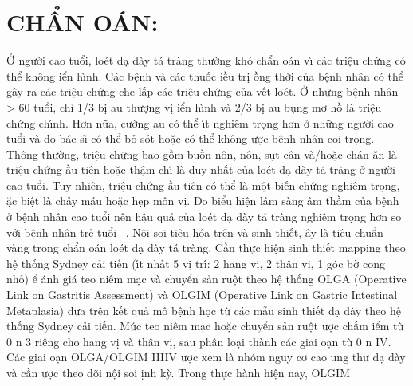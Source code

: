 \documentclass[9pt,twocolumn]{article}
\begin{document}
\section*
  {\textbf{CHẨN \text{\DJ}O\'{A}N:}}
Ở người cao tuổi, lo{\'e}t d{\d{a}} d\`{a}y t\'{a} tr\`{a}ng thường kh{\'{o}} chẩn \text{\dj}o\'{a}n v\`{\i} c\'{a}c tri{\^{\d{e}}}u chứng c{\'{o}} thể kh{\^o}ng \text{\dj}iển h\`{\i}nh. C\'{a}c b{\^{\d{e}}}nh v\`{a} c\'{a}c thuốc \text{\dj}iều tr\d{i} \text{\dj}ồng thời của b{\^{\d{e}}}nh nh\^{a}n c{\'{o}} thể g\^{a}y ra c\'{a}c tri{\^{\d{e}}}u chứng che lấp c\'{a}c tri{\^{\d{e}}}u chứng của v{{\'{\^{e}}}}t lo{\'e}t. Ở những b{\^{\d{e}}}nh nh\^{a}n {\textgreater} 60 tuổi, chỉ 1/3 b\d{i} \text{\dj}au thượng v\d{i} \text{\dj}iển h\`{\i}nh v\`{a} 2/3 b\d{i} \text{\dj}au b\d{u}ng mơ hồ l\`{a} tri{\^{\d{e}}}u chứng ch\'{\i}nh. Hơn nữa, cường  \text{\dj}au c{\'{o}} thể \'{\i}t nghi{\^{e}}m tr\d{o}ng hơn ở những người cao tuổi v\`{a} do  b\'{a}c s{\~{\i}} c{\'{o}} thể bỏ s{\'{o}}t hoặc c{\'{o}} thể kh{\^o}ng \text{\dj}ược b{\^{\d{e}}}nh nh\^{a}n coi tr\d{o}ng. Th{\^o}ng thường, tri{\^{\d{e}}}u chứng bao gồm buồn n{\^o}n, n{\^o}n, s\d{u}t c\^{a}n v\`{a}/hoặc ch\'{a}n {\u{a}}n l\`{a} tri{\^{\d{e}}}u chứng \text{\dj}ầu ti{\^{e}}n hoặc th{\^{\d{a}}}m ch\'{\i} l\`{a} duy nhất của lo{\'e}t d{\d{a}} d\`{a}y t\'{a} tr\`{a}ng ở người cao tuổi. Tuy nhi{\^{e}}n, tri{\^{\d{e}}}u chứng \text{\dj}ầu ti{\^{e}}n c{\'{o}} thể l\`{a} m{\^{\d{o}}}t bi{{\'{\^{e}}}}n chứng nghi{\^{e}}m tr\d{o}ng, \text{\dj}ặc bi{\^{\d{e}}}t l\`{a} chảy m\'{a}u hoặc h\d{e}p m{\^o}n v\d{i}. Do biểu hi{\^{\d{e}}}n l\^{a}m s\`{a}ng \^{a}m thầm của b{\^{\d{e}}}nh ở b{\^{\d{e}}}nh nh\^{a}n cao tuổi n{\^{e}}n h{\^{\d{a}}}u quả của lo{\'e}t d{\d{a}} d\`{a}y t\'{a} tr\`{a}ng nghi{\^{e}}m tr\d{o}ng hơn so với b{\^{\d{e}}}nh nh\^{a}n trẻ tuổi\unskip~\cite{2901310:34531806} . N{\^{\d{o}}}i soi ti{\^{e}}u h{\'{o}}a tr{\^{e}}n v\`{a} sinh thi{{\'{\^{e}}}}t, \text{\dj}\^{a}y l\`{a} ti{\^{e}}u chuẩn v\`{a}ng trong chẩn \text{\dj}o\'{a}n lo{\'e}t d{\d{a}} d\`{a}y t\'{a} tr\`{a}ng. Cần thực hi{\^{\d{e}}}n sinh thi{{\'{\^{e}}}}t mapping theo h{\^{\d{e}}} thống Sydney cải ti{{\'{\^{e}}}}n (\'{\i}t nhất 5 v\d{i} tr\'{\i}: 2 hang v\d{i}, 2 th\^{a}n v\d{i}, 1 g{\'{o}}c bờ cong nhỏ) \text{\dj}ể \text{\dj}\'{a}nh gi\'{a} teo ni{\^{e}}m m{\d{a}}c v\`{a} chuyển sản ru{\^{\d{o}}}t theo h{\^{\d{e}}} thống OLGA (Operative Link on Gastritis Assessment) v\`{a} OLGIM (Operative Link on Gastric Intestinal Metaplasia) dựa tr{\^{e}}n k{{\'{\^{e}}}}t quả m{\^o} b{\^{\d{e}}}nh h\d{o}c từ c\'{a}c mẫu sinh thi{{\'{\^{e}}}}t d{\d{a}} d\`{a}y theo h{\^{\d{e}}} thống Sydney cải ti{{\'{\^{e}}}}n. Mức  teo ni{\^{e}}m m{\d{a}}c hoặc chuyển sản ru{\^{\d{o}}}t \text{\dj}ược chấm \text{\dj}iểm từ 0 n 3 ri{\^{e}}ng cho hang v\d{i} v\`{a} th\^{a}n v\d{i}, sau  ph\^{a}n lo{\d{a}}i th\`{a}nh c\'{a}c giai \text{\dj}o{\d{a}}n từ 0 n IV. C\'{a}c giai \text{\dj}o{\d{a}}n OLGA/OLGIM III{\textendash}IV \text{\dj}ược xem l\`{a} nh{\'{o}}m nguy cơ cao ung thư d{\d{a}} d\`{a}y v\`{a} cần \text{\dj}ược theo d{\~{o}}i n{\^{\d{o}}}i soi \text{\dj}\d{i}nh kỳ. Trong thực h\`{a}nh hi{\^{\d{e}}}n nay, OLGIM 
\end{document}
